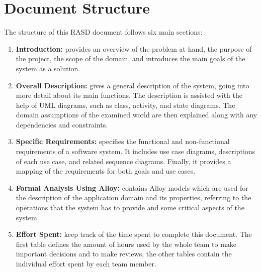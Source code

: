 \section{Document Structure}
The structure of this RASD document follows six main sections:
\begin{enumerate}
    \item \textbf{Introduction:}
          provides an overview of the problem at hand, the purpose of the project,
          the scope of the domain, and introduces the main goals of the system as a solution.

    \item \textbf{Overall Description:}
          gives a general description of the system, going into more detail about its main functions.
          The description is assisted with the help of UML diagrams, such as class, activity, and state diagrams.
          The domain assumptions of the examined world are then explained along with any dependencies and constraints.

    \item \textbf{Specific Requirements:}
          specifies the functional and non-functional requirements of a software system.
          It includes use case diagrams, descriptions of each use case, and related sequence diagrams.
          Finally, it provides a mapping of the requirements for both goals and use cases.

    \item \textbf{Formal Analysis Using Alloy:}
          contains Alloy models which are used for the description of the application domain and its properties,
          referring to the operations that the system has to provide and some critical aspects of the system.

    \item \textbf{Effort Spent:}
          keep track of the time spent to complete this document.
          The first table defines the amount of hours used by the whole team to make important decisions and to make reviews,
          the other tables contain the individual effort spent by each team member.
\end{enumerate}